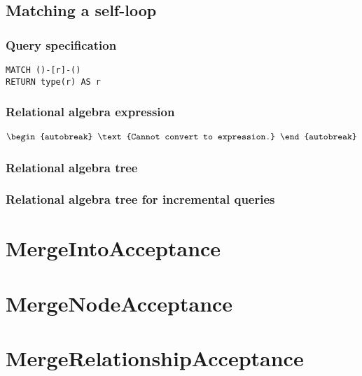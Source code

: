
\subsection{Matching a self-loop}

\subsubsection*{Query specification}

\begin{lstlisting}
MATCH ()-[r]-()
RETURN type(r) AS r
\end{lstlisting}

\subsubsection*{Relational algebra expression}

\begin{align*}
\begin{autobreak}
\text{Cannot convert to expression.}
\end{autobreak}
\end{align*}

\subsubsection*{Relational algebra tree}


\subsubsection*{Relational algebra tree for incremental queries}

\section{MergeIntoAcceptance}

\section{MergeNodeAcceptance}

\section{MergeRelationshipAcceptance}

